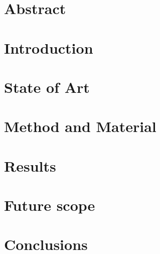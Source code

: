 \documentclass[11pt,oneside]{book}
\begin{document}

%

\clearpage
\newpage
\tableofcontents
\newpage
\listoffigures
\glsaddall

\chapter*{Abstract}


\chapter{Introduction}


\chapter{State of Art}


\chapter{Method and Material}


\chapter{Results}


\chapter{Future scope}


\chapter{Conclusions}




\end{document}
